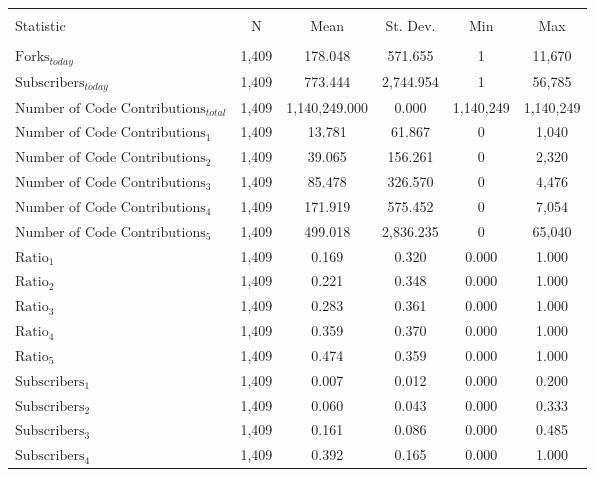 \begin{tabular}{@{\extracolsep{5pt}}lccccc}
\\[-1.8ex]\hline
\hline \\[-1.8ex]
Statistic & \multicolumn{1}{c}{N} & \multicolumn{1}{c}{Mean} & \multicolumn{1}{c}{St. Dev.} & \multicolumn{1}{c}{Min} & \multicolumn{1}{c}{Max} \\
\hline \\[-1.8ex]
$\text{Forks}_{today}$ & 1,409 & 178.048 & 571.655 & 1 & 11,670 \\
$\text{Subscribers}_{today}$ & 1,409 & 773.444 & 2,744.954 & 1 & 56,785 \\
$\text{Number of Code Contributions}_{total}$ & 1,409 & 1,140,249.000 & 0.000 & 1,140,249 & 1,140,249 \\
$\text{Number of Code Contributions}_{1}$ & 1,409 & 13.781 & 61.867 & 0 & 1,040 \\
$\text{Number of Code Contributions}_{2}$ & 1,409 & 39.065 & 156.261 & 0 & 2,320 \\
$\text{Number of Code Contributions}_{3}$ & 1,409 & 85.478 & 326.570 & 0 & 4,476 \\
$\text{Number of Code Contributions}_{4}$ & 1,409 & 171.919 & 575.452 & 0 & 7,054 \\
$\text{Number of Code Contributions}_{5}$ & 1,409 & 499.018 & 2,836.235 & 0 & 65,040 \\
$\text{Ratio}_{1}$ & 1,409 & 0.169 & 0.320 & 0.000 & 1.000 \\
$\text{Ratio}_{2}$ & 1,409 & 0.221 & 0.348 & 0.000 & 1.000 \\
$\text{Ratio}_{3}$ & 1,409 & 0.283 & 0.361 & 0.000 & 1.000 \\
$\text{Ratio}_{4}$ & 1,409 & 0.359 & 0.370 & 0.000 & 1.000 \\
$\text{Ratio}_{5}$ & 1,409 & 0.474 & 0.359 & 0.000 & 1.000 \\
$\text{Subscribers}_{1}$ & 1,409 & 0.007 & 0.012 & 0.000 & 0.200 \\
$\text{Subscribers}_{2}$ & 1,409 & 0.060 & 0.043 & 0.000 & 0.333 \\
$\text{Subscribers}_{3}$ & 1,409 & 0.161 & 0.086 & 0.000 & 0.485 \\
$\text{Subscribers}_{4}$ & 1,409 & 0.392 & 0.165 & 0.000 & 1.000 \\

\end{tabular}
